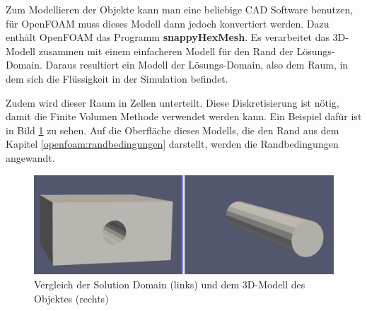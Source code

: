 Zum Modellieren der Objekte kann man eine beliebige CAD Software benutzen, für OpenFOAM muss dieses Modell dann jedoch konvertiert werden.
Dazu enthält OpenFOAM das Programm \textbf{snappyHexMesh}.
Es verarbeitet das 3D-Modell zusammen mit einem einfacheren Modell für den Rand der Lösungs-Domain. 
Daraus resultiert ein Modell der Lösungs-Domain, also dem Raum, in dem sich die Flüssigkeit in der Simulation befindet.

Zudem wird dieser Raum in Zellen unterteilt.
Diese Diskretisierung ist nötig, damit die Finite Volumen Methode verwendet werden kann.
Ein Beispiel dafür ist in Bild \ref{openfoam:fig:SD_Modell_vergleich} zu sehen.
Auf die Oberfläche dieses Modells, die den Rand aus dem Kapitel \ref{openfoam:randbedingungen} darstellt, werden die Randbedingungen angewandt.
\begin{figure}
	\centering
	\includegraphics[scale=0.1]{papers/openfoam/Bilder/vergleich_solution_domain_object.png}
	\caption{Vergleich der Solution Domain (links) und dem 3D-Modell des Objektes (rechts)}
	\label{openfoam:fig:SD_Modell_vergleich}
\end{figure}

